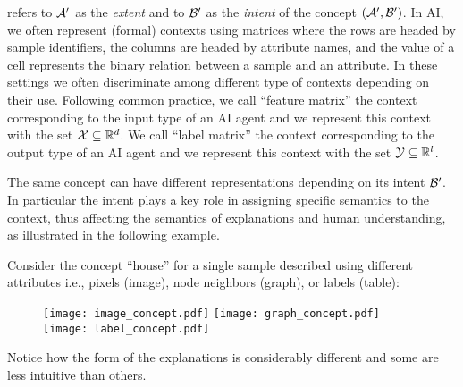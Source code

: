 \citet{ganter1997formal} refers to $\mathcal{A}'$ as the \textit{extent} and to $\mathcal{B}'$ as the \textit{intent} of the concept $(\mathcal{A}',\mathcal{B}')$. In AI, we often represent (formal) contexts using matrices where the rows are headed by sample identifiers, the columns are headed by attribute names, and the value of a cell represents the binary relation between a sample and an attribute. In these settings we often discriminate among different type of contexts depending on their use. Following common practice, we call ``feature matrix'' the context corresponding to the input type of an AI agent and we represent this context with the set $\mathcal{X} \subseteq \mathbb{R}^{d}$. We call ``label matrix'' the context corresponding to the output type of an AI agent and we represent this context with the set $\mathcal{Y} \subseteq \mathbb{R}^{l}$. 
\begin{remark}
The same concept can have different representations depending on its intent $\mathcal{B}'$. In particular the intent plays a key role in assigning specific semantics to the context, thus affecting the semantics of explanations and human understanding, as illustrated in the following example.
\end{remark}
\begin{example}
Consider the concept ``house'' for a single sample described using different attributes i.e., pixels (image), node neighbors (graph), or labels (table):
\begin{figure}[H]
    \centering
    \texttt{[image: image\_concept.pdf]}
    \texttt{[image: graph\_concept.pdf]}
    \texttt{[image: label\_concept.pdf]}
    \label{fig:my_label}
\end{figure}
Notice how the form of the explanations is considerably different and some are less intuitive than others.
\end{example}
